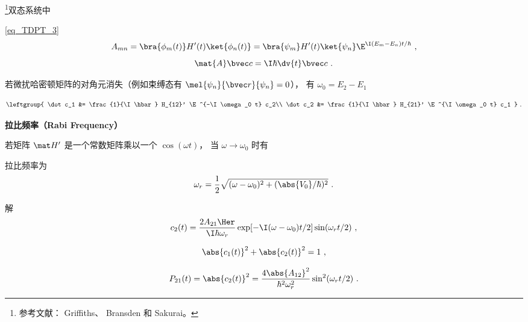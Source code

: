 
\begin{issues}
\issueDraft
\end{issues}

\footnote{参考文献： Griffiths\cite{GriffQ}、 Bransden\cite{Bransden} 和 Sakurai\cite{Sakurai}。}双态系统中

\autoref{eq_TDPT_3}~
\begin{equation}
A_{mn} = \bra{\phi_m(t)} H'(t) \ket{\phi_n(t)} = \bra{\psi_m} H'(t) \ket{\psi_n} \E^{\I(E_m-E_n)t/\hbar}~,
\end{equation}
\begin{equation}
\mat {A} \bvec c = \I\hbar \dv{t} \bvec c~.
\end{equation}

若微扰哈密顿矩阵的对角元消失（例如束缚态有 $\mel{\psi_n}{\bvec r}{\psi_n} = 0$）， 有 $\omega_0 = E_2 - E_1$


\begin{equation}
\leftgroup{
\dot c_1 &= \frac{1}{\I \hbar} H_{12}' \E^{-\I\omega_0 t} c_2\\
\dot c_2 &= \frac{1}{\I \hbar} H_{21}' \E^{\I\omega_0 t} c_1
}~.\end{equation}

\textbf{拉比频率（Rabi Frequency）}

若矩阵 $\mat H'$ 是一个常数矩阵乘以一个 $\cos(\omega t)$， 当 $\omega \to \omega_0$ 时有


拉比频率为
\begin{equation}
\omega_r = \frac{1}{2} \sqrt{(\omega - \omega_0)^2 + (\abs{V_0}/\hbar)^2}~.
\end{equation}

解
\begin{equation}
c_2(t) = \frac{2A_{21}\Her}{\I \hbar \omega_r} \exp[-\I (\omega - \omega_0) t / 2] \sin(\omega_r t/2)~,
\end{equation}


\begin{equation}
\abs{c_1(t)}^2 + \abs{c_2(t)}^2 = 1~,
\end{equation}

\begin{equation}
P_{21}(t) = \abs{c_2(t)}^2 = \frac{4\abs{A_{12}}^2}{\hbar^2 \omega_r^2} \sin^2(\omega_r t/2)~.
\end{equation}
